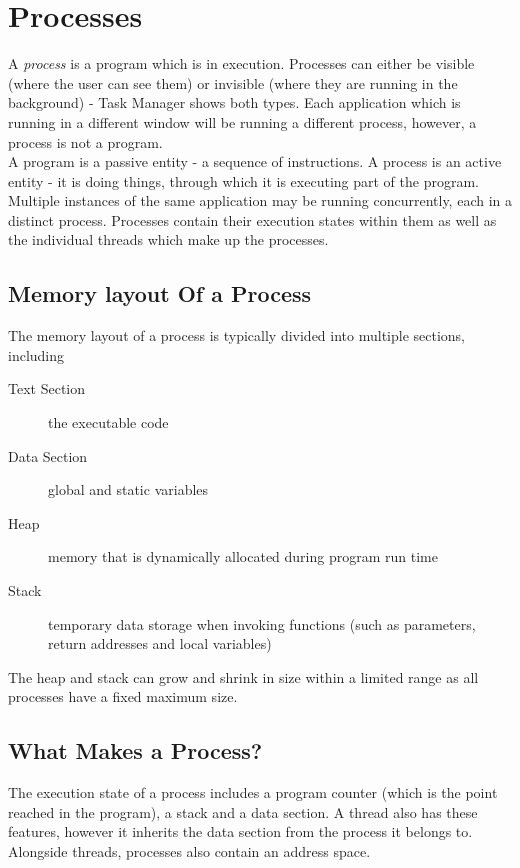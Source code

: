 
\section{Processes}
A \textit{process} is a program which is in execution. Processes can either be visible (where the user can see them) or invisible (where they are running in the background) - Task Manager shows both types. Each application which is running in a different window will be running a different process, however, a process is not a program.\\

A program is a passive entity - a sequence of instructions. A process is an active entity - it is doing things, through which it is executing part of the program. Multiple instances of the same application may be running concurrently, each in a distinct process. Processes contain their execution states within them as well as the individual threads which make up the processes.

\subsection{Memory layout Of a Process}
The memory layout of a process is typically divided into multiple sections, including
\begin{description}
    \item[Text Section] the executable code
    \item[Data Section] global and static variables
    \item[Heap] memory that is dynamically allocated during program run time
    \item[Stack] temporary data storage when invoking functions (such as parameters, return addresses and local variables)
\end{description}
The heap and stack can grow and shrink in size within a limited range as all processes have a fixed maximum size.

\subsection{What Makes a Process?}
The execution state of a process includes a program counter (which is the point reached in the program), a stack and a data section. A thread also has these features, however it inherits the data section from the process it belongs to. Alongside threads, processes also contain an address space.

